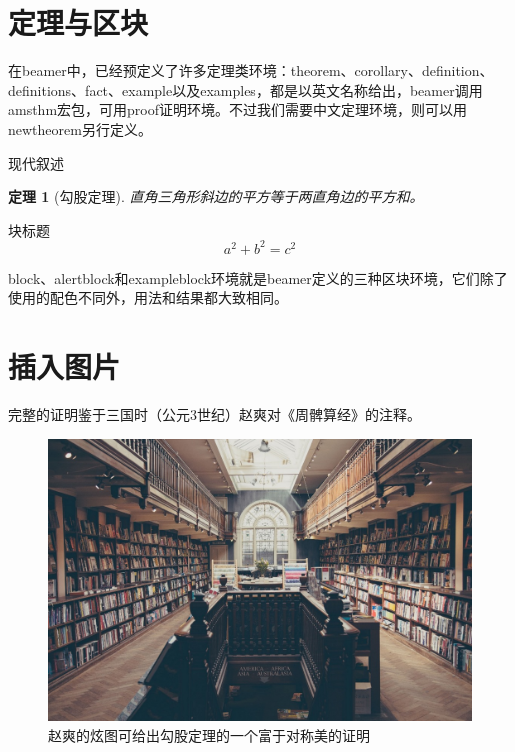 \documentclass[xcolor=table,aspectratio=169]{beamer}
\newtheorem{thm}{定理}
\begin{document}
\section{定理与区块}
\begin{frame}
	在beamer中，已经预定义了许多定理类环境：theorem、corollary、definition、definitions、fact、example以及examples，都是以英文名称给出，beamer调用amsthm宏包，可用proof证明环境。不过我们需要中文定理环境，则可以用newtheorem另行定义。
\end{frame}
\begin{frame}{现代叙述}
\begin{thm}[勾股定理]
	直角三角形斜边的平方等于两直角边的平方和。
	\begin{center}
	\end{center}
\end{thm}

\end{frame}
\begin{frame}
	\begin{block}{块标题}
		$$a^2+b^2=c^2$$
	\end{block}
	block、alertblock和exampleblock环境就是beamer定义的三种区块环境，它们除了使用的配色不同外，用法和结果都大致相同。
\end{frame}


\section{插入图片}
\begin{frame}
完整的证明鉴于三国时（公元3世纪）赵爽对《周髀算经》的注释。
\begin{figure}
	\centering 
	\includegraphics[height=0.4\textheight]{library}
	\caption{赵爽的炫图可给出勾股定理的一个富于对称美的证明}
\end{figure}
\end{frame}
\end{document}
